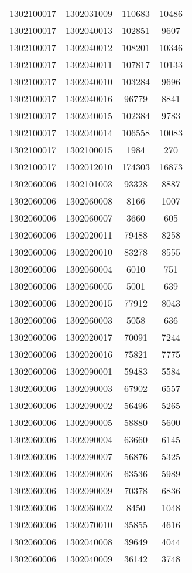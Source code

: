 \begin{longtable}{llcc}
1302100017 & 1302031009 & 110683 & 10486\\
1302100017 & 1302040013 & 102851 & 9607\\
1302100017 & 1302040012 & 108201 & 10346\\
1302100017 & 1302040011 & 107817 & 10133\\
1302100017 & 1302040010 & 103284 & 9696\\
1302100017 & 1302040016 & 96779 & 8841\\
1302100017 & 1302040015 & 102384 & 9783\\
1302100017 & 1302040014 & 106558 & 10083\\
1302100017 & 1302100015 & 1984 & 270\\
1302100017 & 1302012010 & 174303 & 16873\\
1302060006 & 1302101003 & 93328 & 8887\\
1302060006 & 1302060008 & 8166 & 1007\\
1302060006 & 1302060007 & 3660 & 605\\
1302060006 & 1302020011 & 79488 & 8258\\
1302060006 & 1302020010 & 83278 & 8555\\
1302060006 & 1302060004 & 6010 & 751\\
1302060006 & 1302060005 & 5001 & 639\\
1302060006 & 1302020015 & 77912 & 8043\\
1302060006 & 1302060003 & 5058 & 636\\
1302060006 & 1302020017 & 70091 & 7244\\
1302060006 & 1302020016 & 75821 & 7775\\
1302060006 & 1302090001 & 59483 & 5584\\
1302060006 & 1302090003 & 67902 & 6557\\
1302060006 & 1302090002 & 56496 & 5265\\
1302060006 & 1302090005 & 58880 & 5600\\
1302060006 & 1302090004 & 63660 & 6145\\
1302060006 & 1302090007 & 56876 & 5325\\
1302060006 & 1302090006 & 63536 & 5989\\
1302060006 & 1302090009 & 70378 & 6836\\
1302060006 & 1302060002 & 8450 & 1048\\
1302060006 & 1302070010 & 35855 & 4616\\
1302060006 & 1302040008 & 39649 & 4044\\
1302060006 & 1302040009 & 36142 & 3748\\

\end{longtable}
